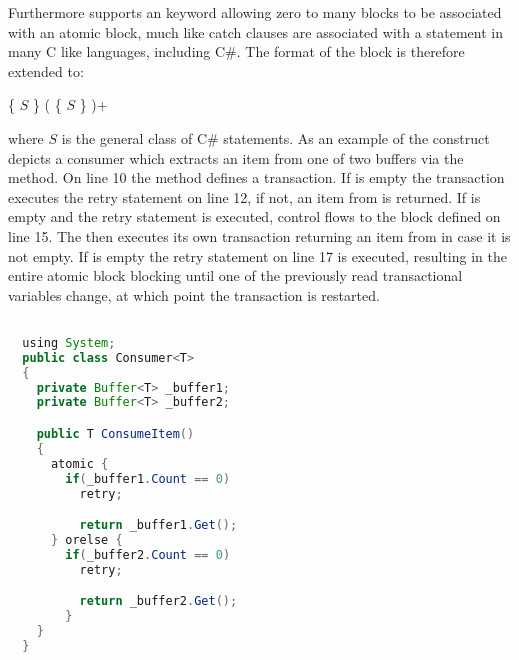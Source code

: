 Furthermore \stmnamesp supports an  keyword allowing zero to many  blocks to be associated with an atomic block, much like catch clauses are associated with a  statement in many C like languages, including C\#\cite[p. 96]{sestoft2011c}. The  format of the  block is therefore extended to:

 \{ $S$ \} (  \{ $S$ \} )+

where $S$ is the general class of C\# statements. As an example of the  construct   depicts a consumer which extracts an item from one of two buffers via the  method. On line 10 the  method defines a transaction. If  is empty the transaction executes the retry statement on line 12, if not, an item from  is returned. If  is empty and the retry statement is executed, control flows to the  block defined on line 15. The  then executes its own transaction returning an item from  in case it is not empty. If  is empty the retry statement on line 17 is executed, resulting in the entire atomic block blocking until one of the previously read transactional variables change, at which point the transaction is restarted.

\begin{lstlisting}[label=lst:stm_atomic_syntax_orelse,
 caption={OrElse Syntax},
 language=Java, 
 showspaces=false,
 showtabs=false,
 breaklines=true,
 showstringspaces=false,
 breakatwhitespace=true,
 commentstyle=\color{greencomments},
 keywordstyle=\color{bluekeywords},
 stringstyle=\color{redstrings},
 morekeywords={atomic, retry, orelse, var, get, set, using}]  % Start your code-block

  using System;
  public class Consumer<T>
  {
    private Buffer<T> _buffer1;
    private Buffer<T> _buffer2;

    public T ConsumeItem()
    {
      atomic {
        if(_buffer1.Count == 0)
          retry;

          return _buffer1.Get();
      } orelse {
        if(_buffer2.Count == 0)
          retry;

          return _buffer2.Get();
        }
    }
  }
\end{lstlisting}

